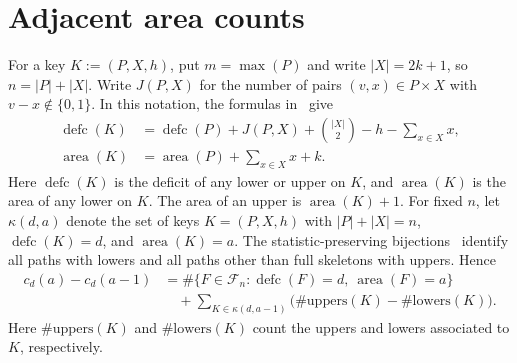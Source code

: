 \documentclass[11pt]{article}
\DeclareMathOperator{\area}{area}\DeclareMathOperator{\dinv}{dinv}
\DeclareMathOperator{\defc}{defc}\DeclareMathOperator{\sym}{sym}
\begin{document}
\section{Adjacent area counts}
For a key $K:=(P,X,h)$, put $m=\max(P)$ and write $|X|=2k+1$, so $n=|P|+|X|$. Write $J(P,X)$ for the number of pairs $(v,x)\in P\times X$ with $v-x\notin\{0,1\}$. In this notation, the formulas in~\cite[\S2]{H} give
\begin{equation}\label{stats}
 \begin{aligned}
 \defc(K)&=\defc(P)+J(P,X)+\binom{|X|}{2}-h-\sum_{x\in X}x,\\
 \area(K)&=\area(P)+\sum_{x\in X}x+k.
 \end{aligned}
\end{equation}
Here $\defc(K)$ is the deficit of any lower or upper on $K$, and $\area(K)$ is the area of any lower on $K$. The area of an upper is $\area(K)+1$. For fixed $n$, let $\kappa(d,a)$ denote the set of keys $K=(P,X,h)$ with $|P|+|X|=n$, $\defc(K)=d$, and $\area(K)=a$. The statistic-preserving bijections~\cite[\S1.2]{H} identify all paths with lowers and all paths other than full skeletons with uppers. Hence
\begin{equation}\label{diff}
 \begin{aligned}
 c_d(a)-c_d(a-1)&=\#\{F\in\mathcal F_n:\defc(F)=d,\ \area(F)=a\}\\
 &\quad+\sum_{K\in\kappa(d,a-1)}\bigl(\#\mathrm{uppers}(K)-\#\mathrm{lowers}(K)\bigr).
 \end{aligned}
\end{equation}
Here $\#\mathrm{uppers}(K)$ and $\#\mathrm{lowers}(K)$ count the uppers and lowers associated to $K$, respectively.
\end{document}
